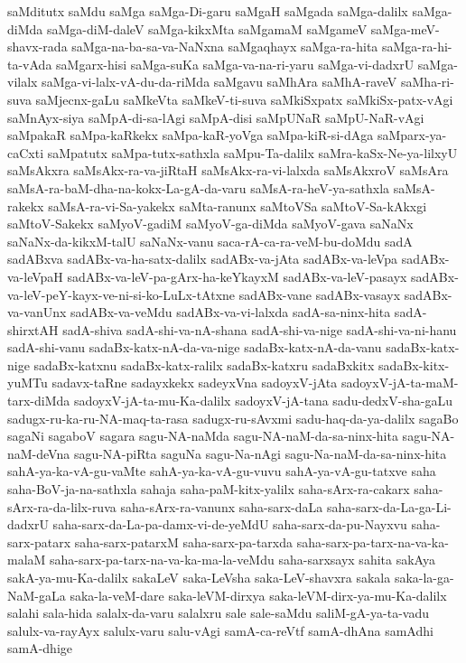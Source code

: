 {saMditutx
saMdu
saMga
saMga-Di-garu
saMgaH
saMgada
saMga-dalilx
saMga-diMda
saMga-diM-daleV
saMga-kikxMta
saMgamaM
saMgameV
saMga-meV-shavx-rada
saMga-na-ba-sa-va-NaNxna
saMgaqhayx
saMga-ra-hita
saMga-ra-hi-ta-vAda
saMgarx-hisi
saMga-suKa
saMga-va-na-ri-yaru
saMga-vi-dadxrU
saMga-vilalx
saMga-vi-lalx-vA-du-da-riMda
saMgavu
saMhAra
saMhA-raveV
saMha-ri-suva
saMjecnx-gaLu
saMkeVta
saMkeV-ti-suva
saMkiSxpatx
saMkiSx-patx-vAgi
saMnAyx-siya
saMpA-di-sa-lAgi
saMpA-disi
saMpUNaR
saMpU-NaR-vAgi
saMpakaR
saMpa-kaRkekx
saMpa-kaR-yoVga
saMpa-kiR-si-dAga
saMparx-ya-caCxti
saMpatutx
saMpa-tutx-sathxla
saMpu-Ta-dalilx
saMra-kaSx-Ne-ya-lilxyU
saMsAkxra
saMsAkx-ra-va-jiRtaH
saMsAkx-ra-vi-lalxda
saMsAkxroV
saMsAra
saMsA-ra-baM-dha-na-kokx-La-gA-da-varu
saMsA-ra-heV-ya-sathxla
saMsA-rakekx
saMsA-ra-vi-Sa-yakekx
saMta-ranunx
saMtoVSa
saMtoV-Sa-kAkxgi
saMtoV-Sakekx
saMyoV-gadiM
saMyoV-ga-diMda
saMyoV-gava
saNaNx
saNaNx-da-kikxM-talU
saNaNx-vanu
saca-rA-ca-ra-veM-bu-doMdu
sadA
sadABxva
sadABx-va-ha-satx-dalilx
sadABx-va-jAta
sadABx-va-leVpa
sadABx-va-leVpaH
sadABx-va-leV-pa-gArx-ha-keYkayxM
sadABx-va-leV-pasayx
sadABx-va-leV-peY-kayx-ve-ni-si-ko-LuLx-tAtxne
sadABx-vane
sadABx-vasayx
sadABx-va-vanUnx
sadABx-va-veMdu
sadABx-va-vi-lalxda
sadA-sa-ninx-hita
sadA-shirxtAH
sadA-shiva
sadA-shi-va-nA-shana
sadA-shi-va-nige
sadA-shi-va-ni-hanu
sadA-shi-vanu
sadaBx-katx-nA-da-va-nige
sadaBx-katx-nA-da-vanu
sadaBx-katx-nige
sadaBx-katxnu
sadaBx-katx-ralilx
sadaBx-katxru
sadaBxkitx
sadaBx-kitx-yuMTu
sadavx-taRne
sadayxkekx
sadeyxVna
sadoyxV-jAta
sadoyxV-jA-ta-maM-tarx-diMda
sadoyxV-jA-ta-mu-Ka-dalilx
sadoyxV-jA-tana
sadu-dedxV-sha-gaLu
sadugx-ru-ka-ru-NA-maq-ta-rasa
sadugx-ru-sAvxmi
sadu-haq-da-ya-dalilx
sagaBo
sagaNi
sagaboV
sagara
sagu-NA-naMda
sagu-NA-naM-da-sa-ninx-hita
sagu-NA-naM-deVna
sagu-NA-piRta
saguNa
sagu-Na-nAgi
sagu-Na-naM-da-sa-ninx-hita
sahA-ya-ka-vA-gu-vaMte
sahA-ya-ka-vA-gu-vuvu
sahA-ya-vA-gu-tatxve
saha
saha-BoV-ja-na-sathxla
sahaja
saha-paM-kitx-yalilx
saha-sArx-ra-cakarx
saha-sArx-ra-da-lilx-ruva
saha-sArx-ra-vanunx
saha-sarx-daLa
saha-sarx-da-La-ga-Li-dadxrU
saha-sarx-da-La-pa-damx-vi-de-yeMdU
saha-sarx-da-pu-Nayxvu
saha-sarx-patarx
saha-sarx-patarxM
saha-sarx-pa-tarxda
saha-sarx-pa-tarx-na-va-ka-malaM
saha-sarx-pa-tarx-na-va-ka-ma-la-veMdu
saha-sarxsayx
sahita
sakAya
sakA-ya-mu-Ka-dalilx
sakaLeV
saka-LeVsha
saka-LeV-shavxra
sakala
saka-la-ga-NaM-gaLa
saka-la-veM-dare
saka-leVM-dirxya
saka-leVM-dirx-ya-mu-Ka-dalilx
salahi
sala-hida
salalx-da-varu
salalxru
sale
sale-saMdu
saliM-gA-ya-ta-vadu
salulx-va-rayAyx
salulx-varu
salu-vAgi
samA-ca-reVtf
samA-dhAna
samAdhi
samA-dhige
}
